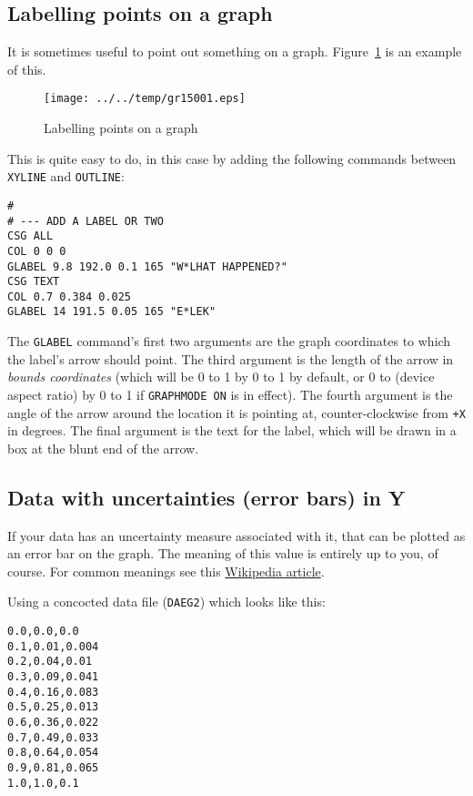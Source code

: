 \documentclass[a4paper,twoside,11pt]{article}
\makeatletter
\def\maxwidth{%
  \ifdim\Gin@nat@width>\linewidth
    \linewidth
  \else
    \Gin@nat@width
  \fi
}
\newcommand{\newpara}{\par\vspace{4mm}\noindent}
\makeatother
\begin{document}
\subsection{Labelling points on a graph}\label{labelling-points-on-a-graph}
\newpara
It is sometimes useful to point out something on a graph.
Figure~\ref{fig:gr15001} is an example of this.

\begin{figure}
  \centering
  \texttt{[image: ../../temp/gr15001.eps]}
  \caption{Labelling points on a graph}
  \label{fig:gr15001}
\end{figure}

\newpara
This is quite easy to do, in this case by adding the following commands
between \texttt{XYLINE} and \texttt{OUTLINE}:

\begin{lstlisting}
#
# --- ADD A LABEL OR TWO
CSG ALL
COL 0 0 0
GLABEL 9.8 192.0 0.1 165 "W*LHAT HAPPENED?"
CSG TEXT
COL 0.7 0.384 0.025
GLABEL 14 191.5 0.05 165 "E*LEK"
\end{lstlisting}

\newpara
The \texttt{GLABEL} command's first two arguments are the graph
coordinates to which the label's arrow should point. The third argument
is the length of the arrow in \emph{bounds coordinates} (which will be 0
to 1 by 0 to 1 by default, or 0 to (device aspect ratio) by 0 to 1 if
\texttt{GRAPHMODE\ ON} is in effect). The fourth argument is the angle
of the arrow around the location it is pointing at, counter-clockwise
from \texttt{+X} in degrees. The final argument is the text for the
label, which will be drawn in a box at the blunt end of the arrow.

\subsection{Data with uncertainties (error bars) in Y}\label{data-with-uncertainties-error-bars-in-y}
\newpara
If your data has an uncertainty measure associated with it, that can be
plotted as an error bar on the graph. The meaning of this value is
entirely up to you, of course. For common meanings see this
\href{https://en.wikipedia.org/wiki/Error_bar}{Wikipedia article}.

\newpara
Using a concocted data file (\texttt{DAEG2}) which looks like this:

\begin{lstlisting}
0.0,0.0,0.0
0.1,0.01,0.004
0.2,0.04,0.01
0.3,0.09,0.041
0.4,0.16,0.083
0.5,0.25,0.013
0.6,0.36,0.022
0.7,0.49,0.033
0.8,0.64,0.054
0.9,0.81,0.065
1.0,1.0,0.1
\end{lstlisting}
\end{document}
